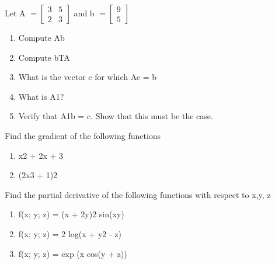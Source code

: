 \documentclass{../amsml}
\begin{document}

\begin{problem}
Let A 
$=\begin{bmatrix}
3 & 5 \\ 
2 & 3
\end{bmatrix}$
and b $=\begin{bmatrix} 9 \\ 5 \end{bmatrix}$

\begin{enumerate}
	\item Compute Ab
	\item Compute bTA
	\item What is the vector c for which Ac = b
	\item What is A1?
	\item Verify that A1b = c. Show that this must be the case.

\end{enumerate}
\end{problem}


\begin{problem}
Find the gradient of the following functions
 
\begin{enumerate}
	\item x2 + 2x + 3
	\item (2x3 + 1)2

\end{enumerate}

Find the partial derivative of the following functions with respect to x,y, z

\begin{enumerate}
	\item f(x; y; z) = (x + 2y)2 sin(xy)
	\item f(x; y; z) = 2 log(x + y2 - z)
	\item f(x; y; z) = exp (x cos(y + z))
\end{enumerate}
\end{problem}

\end{document}
